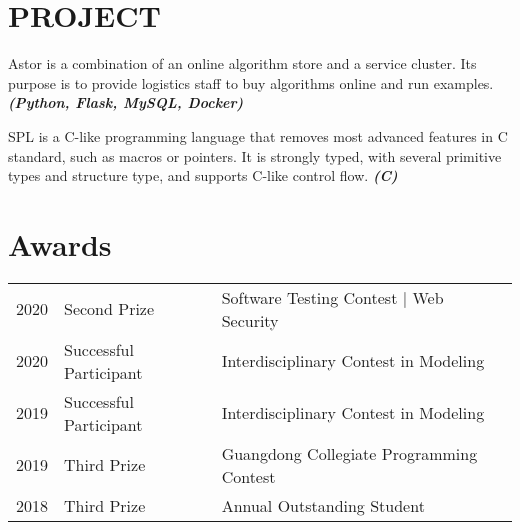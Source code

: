 \documentclass[]{resume}
\begin{document}
\begin{minipage}[t]{0.66\textwidth}

\section{PROJECT}

Astor is a combination of an online algorithm store and a service cluster. Its purpose is to provide logistics staff to buy algorithms online and run examples.
{\footnotesize \textit{\textbf{(Python, Flask, MySQL, Docker) }}} \\
\sectionsep

SPL is a C-like programming language that removes most advanced features in C standard, such as macros or pointers. It is strongly typed, with several primitive types and structure type, and supports C-like control flow.
{\footnotesize \textit{\textbf{(C) }}} \\
\sectionsep


\section{Awards}

\begin{tabular}{rll}
2020     & Second Prize & Software Testing Contest | Web Security \\
2020	 & Successful Participant & Interdisciplinary Contest in Modeling \\
2019	 & Successful Participant & Interdisciplinary Contest in Modeling \\
2019	 & Third Prize & Guangdong Collegiate Programming Contest \\
2018	 & Third Prize & Annual Outstanding Student \\
\end{tabular}
\sectionsep


% 
% 

\end{minipage} 
\end{document}
